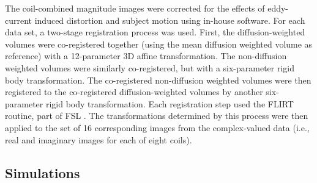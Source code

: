 \documentclass[authoryear,preprint,12pt]{elsarticle}
\begin{document}
The coil-combined magnitude images were corrected for the effects of
eddy-current induced distortion and subject motion using in-house
software.  For each data set, a two-stage registration process was
used.  First, the diffusion-weighted volumes were co-registered
together (using the mean diffusion weighted volume as reference) with
a 12-parameter 3D affine transformation.  The non-diffusion weighted
volumes were similarly co-registered, but with a six-parameter rigid
body transformation.  The co-registered non-diffusion weighted volumes
were then registered to the co-registered diffusion-weighted volumes
by another six-parameter rigid body transformation.  Each registration
step used the FLIRT routine, part of FSL
\citep{jen-smi:global,smi-etal:FSL}.
The transformations determined by this process were then applied to
the set of 16 corresponding images from the complex-valued data (i.e.,
real and imaginary images for each of eight coils).

\subsection{Simulations}
\label{methods-simulations}
\end{document}
